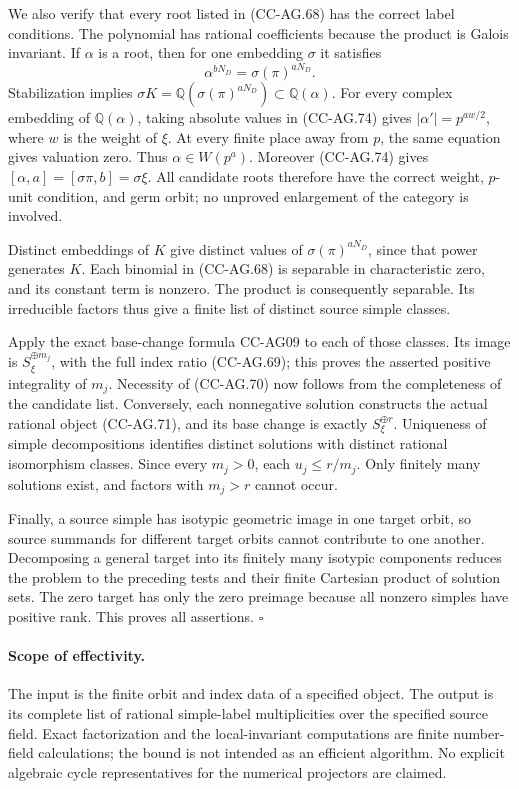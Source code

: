 We also verify that every root listed in (CC-AG.68)
has the correct label conditions.  The polynomial
has rational coefficients because the product is
Galois invariant.  If \(\alpha\) is a root, then
for one embedding \(\sigma\) it satisfies
\[
               \alpha^{bN_D}=\sigma(\pi)^{aN_D}.
                                                               \tag{CC-AG.74}
\]
Stabilization implies
\(\sigma K=\mathbb Q(\sigma(\pi)^{aN_D})
                  \subset\mathbb Q(\alpha)\).
For every complex embedding of \(\mathbb Q(\alpha)\),
taking absolute values in (CC-AG.74) gives
\(|\alpha'|=p^{aw/2}\), where \(w\) is the weight
of \(\xi\).
At every finite place away from \(p\), the same
equation gives valuation zero.
Thus \(\alpha\in W(p^a)\).
Moreover (CC-AG.74) gives
\([\alpha,a]=[\sigma\pi,b]=\sigma\xi\).
All candidate roots therefore have the correct
weight, \(p\)-unit condition, and germ orbit;
no unproved enlargement of the category is involved.

Distinct embeddings of \(K\) give distinct values
of \(\sigma(\pi)^{aN_D}\), since that power
generates \(K\).  Each binomial in (CC-AG.68)
is separable in characteristic zero, and its
constant term is nonzero.  The product is consequently
separable.  Its irreducible factors thus give a
finite list of distinct source simple classes.

Apply the exact base-change formula CC-AG09 to
each of those classes.  Its image is
\(S_\xi^{\oplus m_j}\), with the full index
ratio (CC-AG.69); this proves the asserted positive
integrality of \(m_j\).
Necessity of (CC-AG.70) now follows from the
completeness of the candidate list.
Conversely, each nonnegative solution constructs
the actual rational object (CC-AG.71), and its
base change is exactly \(S_\xi^{\oplus r}\).
Uniqueness of simple decompositions identifies
distinct solutions with distinct rational
isomorphism classes.
Since every \(m_j>0\), each \(u_j\le r/m_j\).
Only finitely many solutions exist, and factors
with \(m_j>r\) cannot occur.

Finally, a source simple has isotypic geometric
image in one target orbit, so source summands
for different target orbits cannot contribute
to one another.  Decomposing a general target
into its finitely many isotypic components
reduces the problem to the preceding tests
and their finite Cartesian product of solution
sets.  The zero target has only the zero
preimage because all nonzero simples have
positive rank.  This proves all assertions.
\(\square\)

\paragraph{Scope of effectivity.}
The input is the finite orbit and index data of a
specified object.  The output is its complete list
of rational simple-label multiplicities over the
specified source field.  Exact factorization and
the local-invariant computations are finite
number-field calculations; the bound is not
intended as an efficient algorithm.
No explicit algebraic cycle representatives for
the numerical projectors are claimed.

